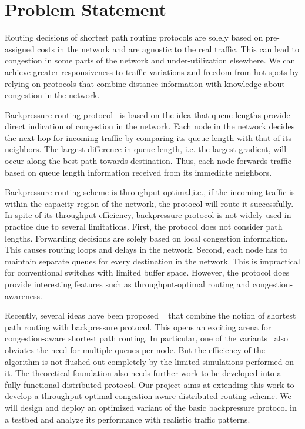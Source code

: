\label{sec:prob}


\section*{Problem Statement}

Routing decisions of shortest path routing protocols are solely based on pre-assigned costs in the network and are agnostic to the real traffic. This can lead to congestion in some parts of the network and under-utilization elsewhere. We can achieve greater responsiveness to traffic variations and freedom from hot-spots by relying on protocols that combine distance information with knowledge about congestion in the network. 

Backpressure routing protocol~\cite{BP-orig} is based on the idea that queue lengths provide direct indication of congestion in the network. Each node in the network decides the next hop for incoming traffic by comparing its queue length with that of its neighbors. The largest difference in queue length, i.e. the largest gradient, will occur along the best path towards destination. Thus, each node forwards traffic based on queue length information received from its immediate neighbors. 

Backpressure routing scheme is throughput optimal,i.e., if the incoming traffic is within the capacity region of the network, the protocol will route it successfully. In spite of its throughput efficiency, backpressure protocol is not widely used in practice due to several limitations. First, the protocol does not consider path lengths. Forwarding decisions are solely based on local congestion information. This causes routing loops and delays in the network. Second, each node has to maintain separate queues for every destination in the network. This is impractical for conventional switches with limited buffer space. However, the protocol does provide interesting features such as throughput-optimal routing and congestion-awareness. 

Recently, several ideas have been proposed ~\cite{Srikant3, Austin1} that combine the notion of shortest path routing with backpressure protocol. This opens an exciting arena for congestion-aware shortest path routing. In particular, one of the variants~\cite{Srikant3} also obviates the need for multiple queues per node. But the efficiency of the algorithm is not flushed out completely by the limited simulations performed on it. The theoretical foundation also needs further work to be developed into a fully-functional distributed protocol. Our project aims at extending this work to develop a throughput-optimal congestion-aware distributed routing scheme. We will design and deploy an optimized variant of the basic backpressure protocol in a testbed and analyze its performance with realistic traffic patterns.  
